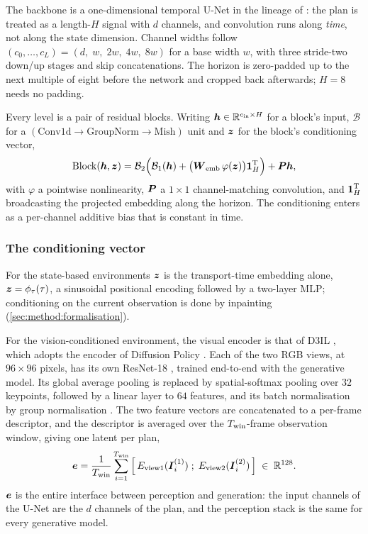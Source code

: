 The backbone is a one-dimensional temporal U-Net in the lineage of
\parencite{janner2022planning}: the plan is treated as a length-$H$ signal with $d$ channels,
and convolution runs along \emph{time}, not along the state dimension. Channel widths follow
$\left(c_{0},\dots,c_{L}\right) = \left(d,\;w,\;2w,\;4w,\;8w\right)$ for a base width $w$, with
three stride-two down/up stages and skip concatenations. The horizon is zero-padded up to the next
multiple of eight before the network and cropped back afterwards; $H = 8$ needs no padding.

Every level is a pair of residual blocks. Writing $\boldsymbol{h}\in\mathbb{R}^{c_{\textrm{in}}\times H}$ for a block's
input, $\mathcal{B}$ for a $\left(\text{Conv1d}\to\text{GroupNorm}\to\text{Mish}\right)$ unit and
$\boldsymbol{z}$ for the block's conditioning vector,
\begin{equation}\label{eq:method:backbone:block}
  \operatorname{Block}(\boldsymbol{h},\boldsymbol{z})
  = \mathcal{B}_{2}\Big(\mathcal{B}_{1}(\boldsymbol{h}) + \big(\boldsymbol{W}_{\textrm{emb}}\,\varphi(\boldsymbol{z})\big)\boldsymbol{1}_{H}^{\textrm{T}}\Big)
    + \boldsymbol{P}\boldsymbol{h},
\end{equation}
with $\varphi$ a pointwise nonlinearity, $\boldsymbol{P}$ a $1\times1$ channel-matching convolution, and
$\boldsymbol{1}_{H}^{\textrm{T}}$ broadcasting the projected embedding along the horizon. The conditioning
enters as a per-channel additive bias that is constant in time.

\subsubsection*{The conditioning vector}

For the state-based environments $\boldsymbol{z}$ is the transport-time embedding alone,
$\boldsymbol{z} = \phi_{\tau}(\tau)$, a sinusoidal positional encoding followed by a two-layer MLP;
conditioning on the current observation is done by inpainting
(\autoref{sec:method:formalisation}).

For the vision-conditioned environment, the visual encoder is that of D3IL \parencite{jia2024towards},
which adopts the encoder of Diffusion Policy \parencite[Sec.~3.2]{chi2023diffusion}. Each of the two
RGB views, at $96\times96$ pixels, has its own ResNet-18 \parencite{he2016deep}, trained end-to-end
with the generative model. Its global average pooling is replaced by spatial-softmax pooling
\parencite{mandlekar2021matters} over $32$ keypoints, followed by a linear layer to $64$ features, and
its batch normalisation by group normalisation \parencite{wu2018group}. The two feature vectors are
concatenated to a per-frame descriptor, and the descriptor is averaged over the
$T_{\textrm{win}}$-frame observation window, giving one latent per plan,
\begin{equation}\label{eq:method:backbone:latent}
  \boldsymbol{e}
  = \frac{1}{T_{\textrm{win}}}\sum_{i=1}^{T_{\textrm{win}}}
    \Big[\,E_{\textrm{view1}}(\boldsymbol{I}^{(1)}_{i})\;;\;E_{\textrm{view2}}(\boldsymbol{I}^{(2)}_{i})\,\Big]
  \;\in\;\mathbb{R}^{128}.
\end{equation}
$\boldsymbol{e}$ is the entire interface between perception and generation: the input channels of the
U-Net are the $d$ channels of the plan, and the perception stack is the same for every generative
model.

